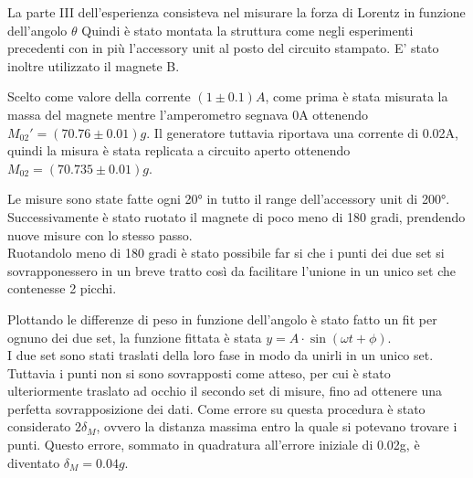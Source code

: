{\fontsize{12}{14}\selectfont 

La parte III dell'esperienza consisteva nel misurare la forza di Lorentz in funzione dell'angolo $\theta$ Quindi è stato montata la struttura come negli esperimenti precedenti con in più l'accessory unit al posto del circuito stampato. E' stato inoltre utilizzato il magnete B.
\par
Scelto come valore della corrente $(1 \pm 0.1) A$, come prima è stata misurata la massa del magnete mentre l'amperometro segnava 0A ottenendo $M_{02}' = (70.76 \pm 0.01) g$. Il generatore tuttavia riportava una corrente di 0.02A, quindi la misura è stata replicata a circuito aperto ottenendo $M_{02} = (70.735 \pm 0.01) g$.
\par
Le misure sono state fatte ogni 20° in tutto il range dell'accessory unit di 200°. Successivamente è stato ruotato il magnete di poco meno di 180 gradi, prendendo nuove misure con lo stesso passo.
\\
Ruotandolo meno di 180 gradi è stato possibile far si che i punti dei due set si sovrapponessero in un breve tratto così da facilitare l'unione in un unico set che contenesse 2 picchi.
\par
Plottando le differenze di peso in funzione dell'angolo è stato fatto un fit per ognuno dei due set, la funzione fittata è stata $y = A\cdot \sin(\omega t + \phi)$.
\\
I due set sono stati traslati della loro fase in modo da unirli in un unico set. Tuttavia i punti non si sono sovrapposti come atteso, per cui è stato ulteriormente traslato ad occhio il secondo set di misure, fino ad ottenere una perfetta sovrapposizione dei dati. Come errore su questa procedura è stato considerato $2\delta_{M}$, ovvero la distanza massima entro la quale si potevano trovare i punti. Questo errore, sommato in quadratura all'errore iniziale di 0.02g, è diventato $\delta_M = 0.04g$.

\par}